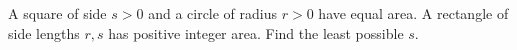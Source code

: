 A square of side $s>0$ and a circle of radius $r>0$ have equal area. A rectangle of side lengths $r,s$ has positive integer area. Find the least possible $s$.
